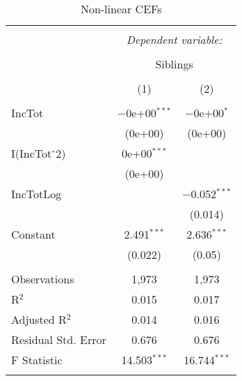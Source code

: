 
\begin{table}[H] \centering 
  \caption{Non-linear CEFs} 
  \label{} 
\begin{tabular}{@{\extracolsep{5pt}}lcc} 
\\[-1.8ex]\hline 
\hline \\[-1.8ex] 
 & \multicolumn{2}{c}{\textit{Dependent variable:}} \\ 
\cline{2-3} 
\\[-1.8ex] & \multicolumn{2}{c}{Siblings} \\ 
\\[-1.8ex] & (1) & (2)\\ 
\hline \\[-1.8ex] 
 IncTot & $-$0e+00$^{***}$ & $-$0e+00$^{*}$ \\ 
  & (0e+00) & (0e+00) \\ 
  I(IncTot$\hat{\mkern6mu}$2) & 0e+00$^{***}$ &  \\ 
  & (0e+00) &  \\ 
  IncTotLog &  & $-$0.052$^{***}$ \\ 
  &  & (0.014) \\ 
  Constant & 2.491$^{***}$ & 2.636$^{***}$ \\ 
  & (0.022) & (0.05) \\ 
 \hline \\[-1.8ex] 
Observations & 1,973 & 1,973 \\ 
R$^{2}$ & 0.015 & 0.017 \\ 
Adjusted R$^{2}$ & 0.014 & 0.016 \\ 
Residual Std. Error & 0.676 & 0.676 \\ 
F Statistic & 14.503$^{***}$ & 16.744$^{***}$ \\ 
\hline 
\hline \\[-1.8ex] 
\end{tabular} 
\end{table} 
